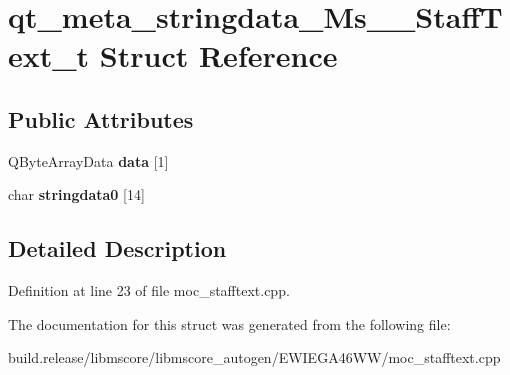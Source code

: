 \hypertarget{structqt__meta__stringdata___ms_____staff_text__t}{}\section{qt\+\_\+meta\+\_\+stringdata\+\_\+\+Ms\+\_\+\+\_\+\+Staff\+Text\+\_\+t Struct Reference}
\label{structqt__meta__stringdata___ms_____staff_text__t}
\subsection*{Public Attributes}
\begin{DoxyCompactItemize}
\item 
\mbox{\label{structqt__meta__stringdata___ms_____staff_text__t_aa1d131c610a61d6a9d9042947baf618b}} 
Q\+Byte\+Array\+Data {\bfseries data} \mbox{[}1\mbox{]}
\item 
\mbox{\label{structqt__meta__stringdata___ms_____staff_text__t_a0063d1b63ba5a34694eb8dd2830a9918}} 
char {\bfseries stringdata0} \mbox{[}14\mbox{]}
\end{DoxyCompactItemize}


\subsection{Detailed Description}


Definition at line 23 of file moc\+\_\+stafftext.\+cpp.



The documentation for this struct was generated from the following file\+:\begin{DoxyCompactItemize}
\item 
build.\+release/libmscore/libmscore\+\_\+autogen/\+E\+W\+I\+E\+G\+A46\+W\+W/moc\+\_\+stafftext.\+cpp\end{DoxyCompactItemize}

